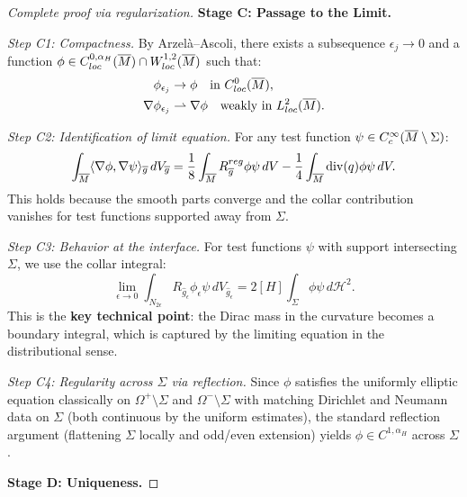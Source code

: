 \begin{proof}[Complete proof via regularization]
\textbf{Stage C: Passage to the Limit.}

\textit{Step C1: Compactness.}
By Arzel\`a--Ascoli, there exists a subsequence $\epsilon_j \to 0$ and a function $\phi \in C^{0,\alpha_H}_{loc}(\overline{M}) \cap W^{1,2}_{loc}(\overline{M})$ such that:
\begin{align}
    \phi_{\epsilon_j} &\to \phi \quad \text{in } C^0_{loc}(\overline{M}), \\
    \nabla \phi_{\epsilon_j} &\rightharpoonup \nabla \phi \quad \text{weakly in } L^2_{loc}(\overline{M}).
\end{align}

\textit{Step C2: Identification of limit equation.}
For any test function $\psi \in C^\infty_c(\overline{M} \setminus \Sigma)$:
\begin{equation}
    \int_{\overline{M}} \langle \nabla \phi, \nabla \psi \rangle_{\overline{g}} \, dV_{\overline{g}} = \frac{1}{8}\int_{\overline{M}} R_{\overline{g}}^{reg} \phi \psi \, dV - \frac{1}{4}\int_{\overline{M}} \mathrm{div}(q) \phi \psi \, dV.
\end{equation}
This holds because the smooth parts converge and the collar contribution vanishes for test functions supported away from $\Sigma$.

\textit{Step C3: Behavior at the interface.}
For test functions $\psi$ with support intersecting $\Sigma$, we use the collar integral:
\begin{equation}
    \lim_{\epsilon \to 0} \int_{N_{2\epsilon}} R_{\hat{g}_\epsilon} \phi_\epsilon \psi \, dV_{\hat{g}_\epsilon} = 2[H] \int_\Sigma \phi \psi \, d\mathcal{H}^2.
\end{equation}
This is the \textbf{key technical point}: the Dirac mass in the curvature becomes a boundary integral, which is captured by the limiting equation in the distributional sense.

\textit{Step C4: Regularity across $\Sigma$ via reflection.}
Since $\phi$ satisfies the uniformly elliptic equation classically on $\Omega^+ \setminus \Sigma$ and $\Omega^- \setminus \Sigma$ with matching Dirichlet and Neumann data on $\Sigma$ (both continuous by the uniform estimates), the standard reflection argument (flattening $\Sigma$ locally and odd/even extension) yields $\phi \in C^{1,\alpha_H}$ across $\Sigma$.

\textbf{Stage D: Uniqueness.}


\end{proof}
